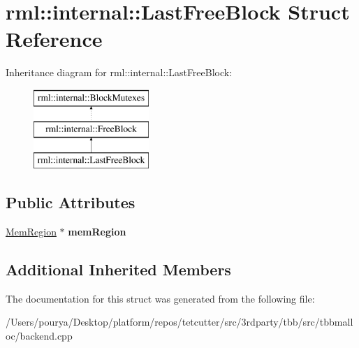\hypertarget{structrml_1_1internal_1_1LastFreeBlock}{}\section{rml\+:\+:internal\+:\+:Last\+Free\+Block Struct Reference}
\label{structrml_1_1internal_1_1LastFreeBlock}
Inheritance diagram for rml\+:\+:internal\+:\+:Last\+Free\+Block\+:\begin{figure}[H]
\begin{center}
\leavevmode
\includegraphics[height=3.000000cm]{structrml_1_1internal_1_1LastFreeBlock}
\end{center}
\end{figure}
\subsection*{Public Attributes}
\begin{DoxyCompactItemize}
\item 
\hypertarget{structrml_1_1internal_1_1LastFreeBlock_ae49859dcd07b377e2444a90624a0ea37}{}\hyperlink{structrml_1_1internal_1_1MemRegion}{Mem\+Region} $\ast$ {\bfseries mem\+Region}\label{structrml_1_1internal_1_1LastFreeBlock_ae49859dcd07b377e2444a90624a0ea37}

\end{DoxyCompactItemize}
\subsection*{Additional Inherited Members}


The documentation for this struct was generated from the following file\+:\begin{DoxyCompactItemize}
\item 
/\+Users/pourya/\+Desktop/platform/repos/tetcutter/src/3rdparty/tbb/src/tbbmalloc/backend.\+cpp\end{DoxyCompactItemize}

